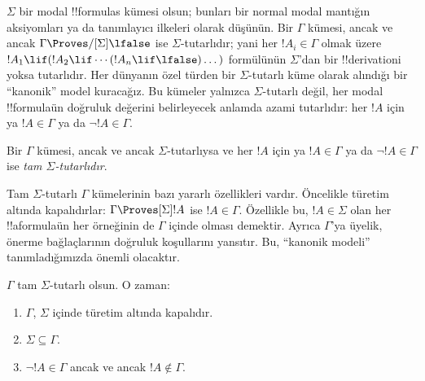 



$\Sigma$ bir modal !!{formula}s kümesi olsun; bunları bir normal modal
mantığın aksiyomları ya da tanımlayıcı ilkeleri olarak düşünün. Bir $\Gamma$
kümesi, ancak ve ancak $\Gamma\Proves/[\Sigma]\lfalse$ ise
$\Sigma$-tutarlıdır; yani her $!A_i\in\Gamma$ olmak üzere
$!A_1\lif(!A_2\lif\cdots(!A_n\lif\lfalse)\dots)$ formülünün $\Sigma$'dan
bir !!{derivation}{}i yoksa tutarlıdır. Her dünyanın özel türden bir
$\Sigma$-tutarlı küme olarak alındığı bir ``kanonik'' model kuracağız. Bu
kümeler yalnızca $\Sigma$-tutarlı değil, her modal !!{formula}{}ün doğruluk
değerini belirleyecek anlamda azami tutarlıdır: her $!A$ için ya
$!A\in\Gamma$ ya da $\lnot !A\in\Gamma$.

\begin{defn}
  Bir $\Gamma$ kümesi, ancak ve ancak $\Sigma$-tutarlıysa ve her $!A$ için
  ya $!A\in\Gamma$ ya da $\lnot !A\in\Gamma$ ise \emph{tam
  $\Sigma$-tutarlıdır}.
\end{defn}

Tam $\Sigma$-tutarlı $\Gamma$ kümelerinin bazı yararlı özellikleri vardır.
Öncelikle türetim altında kapalıdırlar: $\Gamma\Proves[\Sigma]!A$ ise
$!A\in\Gamma$. Özellikle bu, $!A\in\Sigma$ olan her !!a{formula}{}ün her
örneğinin de $\Gamma$ içinde olması demektir. Ayrıca $\Gamma$'ya üyelik,
önerme bağlaçlarının doğruluk koşullarını yansıtır. Bu, ``kanonik modeli''
tanımladığımızda önemli olacaktır.

\begin{prop}
  $\Gamma$ tam $\Sigma$-tutarlı olsun. O zaman:
  \begin{enumerate}
  \item {}%
    $\Gamma$, $\Sigma$ içinde türetim altında kapalıdır.
  \item {}%
    $\Sigma\subseteq\Gamma$.
  \item {}%
    $\lnot!A\in\Gamma$ ancak ve ancak $!A\notin\Gamma$.
  \end{enumerate}
\end{prop}

